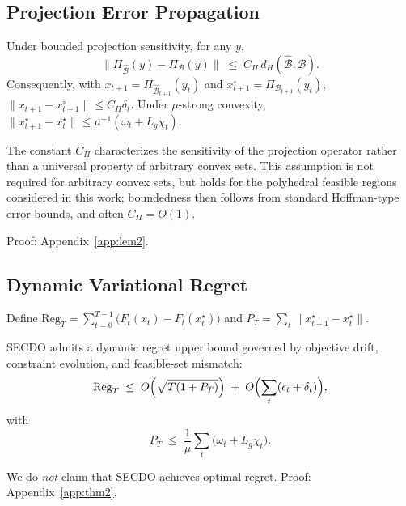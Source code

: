 \subsection{Projection Error Propagation}
\begin{lemma}
\label{lem:2}
Under bounded projection sensitivity, for any $y$,
\begin{equation}
\bigl\|\Pi_{\hat{\mathcal{B}}}(y)-\Pi_{\mathcal{B}}(y)\bigr\|
\;\le\;
C_\Pi\, d_H(\hat{\mathcal{B}},\mathcal{B}).
\end{equation}
Consequently, with $x_{t+1}=\Pi_{\hat{\mathcal{B}}_{t+1}}(y_t)$ and $x_{t+1}^\circ=\Pi_{\mathcal{B}_{t+1}}(y_t)$,
$\|x_{t+1}-x_{t+1}^\circ\|\le C_\Pi\delta_t$.
Under $\mu$-strong convexity,
$\|x_{t+1}^\star-x_t^\star\|\le\mu^{-1}(\omega_t+L_g\chi_t)$.
\end{lemma}
\begin{remark}
\label{rem:Cpi}
The constant $C_\Pi$ characterizes the sensitivity of the projection operator rather than a universal property of arbitrary convex sets.
This assumption is not required for arbitrary convex sets, but holds for the polyhedral feasible regions considered in this work; boundedness then follows from standard Hoffman-type error bounds, and often $C_\Pi=O(1)$.
\end{remark}
Proof: Appendix~\ref{app:lem2}.

\subsection{Dynamic Variational Regret}
Define $\mathrm{Reg}_T=\sum_{t=0}^{T-1}\bigl(F_t(x_t)-F_t(x_t^\star)\bigr)$ and
$P_T=\sum_{t}\|x_{t+1}^\star-x_t^\star\|$.
\begin{theorem}
\label{thm:2}
SECDO admits a dynamic regret upper bound governed by objective drift, constraint evolution, and feasible-set mismatch:
\begin{equation}
\mathrm{Reg}_T
\;\le\;
O\Bigl(\sqrt{T(1+P_T)}\Bigr)
\;+\;
O\Bigl(\sum_t(\epsilon_t+\delta_t)\Bigr),
\end{equation}
with
\begin{equation}
P_T
\;\le\;
\frac1\mu\sum_t\bigl(\omega_t+L_g\chi_t\bigr).
\end{equation}
\end{theorem}
We do \emph{not} claim that SECDO achieves optimal regret.
Proof: Appendix~\ref{app:thm2}.

